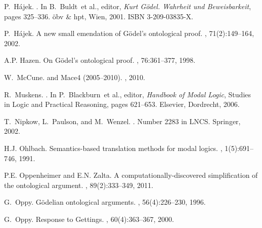 \documentclass{article}
\begin{document}
\begin{thebibliography}{}
P.~H\'ajek.
.
\newblock In B.~Buldt~et al., editor, {\em {Kurt G{\"o}del. Wahrheit und
  Beweisbarkeit}}, pages 325--336. öbv \& hpt, Wien, 2001.
\newblock ISBN 3-209-03835-X.

P.~H{\'{a}}jek.
\newblock A new small emendation of {G{\"{o}}del's} ontological proof.
, 71(2):149--164, 2002.

A.P. Hazen.
\newblock On {G\"odel's} ontological proof.
, 76:361--377, 1998.

W.~McCune.
 and {Mace4} (2005--2010).
, 2010.

R.~Muskens.
.
\newblock In P.~Blackburn~et al., editor, {\em Handbook of Modal Logic},
  Studies in Logic and Practical Reasoning, pages 621--653. Elsevier,
  Dordrecht, 2006.

T.~Nipkow, L.~Paulson, and M.~Wenzel.
.
\newblock Number 2283 in LNCS. Springer, 2002.

H.J. Ohlbach.
\newblock Semantics-based translation methods for modal logics.
, 1(5):691--746, 1991.

P.E. Oppenheimer and E.N. Zalta.
\newblock A computationally-discovered simplification of the ontological
  argument.
, 89(2):333--349, 2011.

G.~Oppy.
\newblock G{\"o}delian ontological arguments.
, 56(4):226--230, 1996.

G.~Oppy.
\newblock Response to {Gettings}.
, 60(4):363--367, 2000.


\end{thebibliography}
\end{document}

